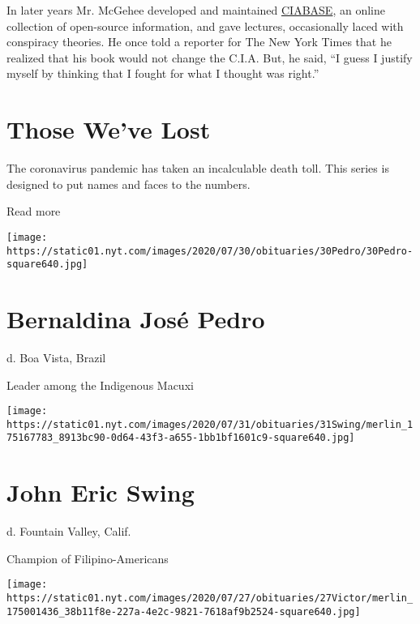 In later years Mr. McGehee developed and maintained
\href{https://archive.org/details/CIABASE-Ralph_McGehee}{CIABASE}, an
online collection of open-source information, and gave lectures,
occasionally laced with conspiracy theories. He once told a reporter for
The New York Times that he realized that his book would not change the
C.I.A. But, he said, ``I guess I justify myself by thinking that I
fought for what I thought was right.''

\href{https://www.nytimes.com/interactive/2020/obituaries/people-died-coronavirus-obituaries.html?action=click\&pgtype=Article\&state=default\&region=BELOW_MAIN_CONTENT\&context=covid_obits_promo}{}

\hypertarget{those-weve-lost}{%
\section{Those We've Lost}\label{those-weve-lost}}

The coronavirus pandemic has taken an incalculable death toll. This
series is designed to put names and faces to the numbers.

Read more

\texttt{[image: https://static01.nyt.com/images/2020/07/30/obituaries/30Pedro/30Pedro-square640.jpg]}

\hypertarget{bernaldina-josuxe9-pedro}{%
\section{Bernaldina José Pedro}\label{bernaldina-josuxe9-pedro}}

d. Boa Vista, Brazil

Leader among the Indigenous Macuxi

\texttt{[image: https://static01.nyt.com/images/2020/07/31/obituaries/31Swing/merlin\_175167783\_8913bc90-0d64-43f3-a655-1bb1bf1601c9-square640.jpg]}

\hypertarget{john-eric-swing}{%
\section{John Eric Swing}\label{john-eric-swing}}

d. Fountain Valley, Calif.

Champion of Filipino-Americans

\texttt{[image: https://static01.nyt.com/images/2020/07/27/obituaries/27Victor/merlin\_175001436\_38b11f8e-227a-4e2c-9821-7618af9b2524-square640.jpg]}

